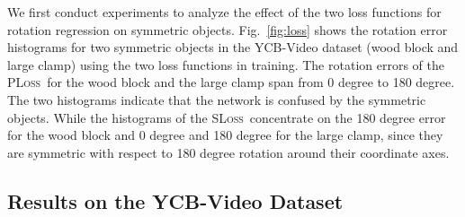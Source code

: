 \documentclass[conference]{IEEEtran}
\newcommand{\sloss}{\textsc{SLoss}}
\newcommand{\pl}{\textsc{PLoss}}
\begin{document}
We first conduct experiments to analyze the effect of the two loss functions for rotation regression on symmetric objects. Fig.~\ref{fig:loss} shows the rotation error histograms for two symmetric objects in the YCB-Video dataset (wood block and large clamp) using the two loss functions in training. The rotation errors of the \pl\ for the wood block and the large clamp span from 0 degree to 180 degree. The two histograms indicate that the network is confused by the symmetric objects. While the histograms of the \sloss\ concentrate on the 180 degree error for the wood block and 0 degree and 180 degree for the large clamp, since they are symmetric with respect to 180 degree rotation around their coordinate axes.

\subsection{Results on the YCB-Video Dataset}
\end{document}

